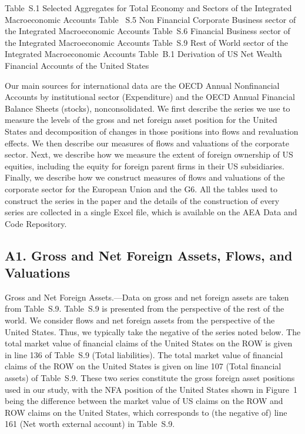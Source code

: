 \documentclass[11pt]{article}
\begin{document}
\textbullet{} Table S.1 Selected Aggregates for Total Economy and Sectors of the Integrated Macroeconomic Accounts \textbullet{} Table  S.5 Non Financial Corporate Business sector of the Integrated Macroeconomic Accounts \textbullet{} Table S.6 Financial Business sector of the Integrated Macroeconomic Accounts \textbullet{} Table S.9 Rest of World sector of the Integrated Macroeconomic Accounts \textbullet{} Table B.1 Derivation of US Net Wealth Financial Accounts of the United States


Our main sources for international data are the OECD Annual Nonfinancial Accounts by institutional sector (Expenditure) and the OECD Annual Financial Balance Sheets (stocks), nonconsolidated. We first describe the series we use to measure the levels of the gross and net foreign asset position for the United States and decomposition of changes in those positions into flows and revaluation effects. We then describe our measures of flows and valuations of the corporate sector. Next, we describe how we measure the extent of foreign ownership of US equities, including the equity for foreign parent firms in their US subsidiaries. Finally, we describe how we construct measures of flows and valuations of the corporate sector for the European Union and the G6. All the tables used to construct the series in the paper and the details of the construction of every series are collected in a single Excel file, which is available on the AEA Data and Code Repository.


\subsection*{A1. Gross and Net Foreign Assets, Flows, and Valuations}


Gross and Net Foreign Assets.—Data on gross and net foreign assets are taken from Table S.9. Table S.9 is presented from the perspective of the rest of the world. We consider flows and net foreign assets from the perspective of the United States. Thus, we typically take the negative of the series noted below. The total market value of financial claims of the United States on the ROW is given in line 136 of Table S.9 (Total liabilities). The total market value of financial claims of the ROW on the United States is given on line 107 (Total financial assets) of Table S.9. These two series constitute the gross foreign asset positions used in our study, with the NFA position of the United States shown in Figure 1 being the difference between the market value of US claims on the ROW and ROW claims on the United States, which corresponds to (the negative of) line 161 (Net worth external account) in Table S.9.
\end{document}
